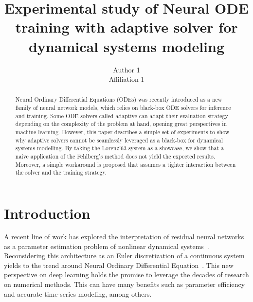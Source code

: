 \documentclass{article}
\title{Experimental study of Neural ODE training with adaptive solver
  for dynamical systems modeling}
\author{%
  Author 1\\
  Affiliation 1
}
\begin{document}
\maketitle

\begin{abstract}
  Neural Ordinary Differential Equations (ODEs) was recently
  introduced as a new family of neural network models, which relies on
  black-box ODE solvers for inference and training. Some ODE solvers
  called adaptive can adapt their evaluation strategy depending on the
  complexity of the problem at hand, opening great perspectives in
  machine learning. However, this paper describes a simple set of
  experiments to show why adaptive solvers cannot be seamlessly
  leveraged as a black-box for dynamical systems modelling. By taking
  the Lorenz'63 system as a showcase, we show that a naive application
  of the Fehlberg's method does not yield the expected
  results. Moreover, a simple workaround is proposed that assumes a
  tighter interaction between the solver and the training strategy.
\end{abstract}

\section{Introduction}
\label{sec:intro}



A recent line of work has explored the interpretation of residual
neural networks~\cite{He16Deep} as a parameter estimation problem of
nonlinear dynamical
systems~\cite{Haber17Stable,WE17Proposal,Lu18Beyond}.  Reconsidering
this architecture as an Euler discretization of a continuous system
yields to the trend around Neural Ordinary Differential
Equation~\cite{Chen18NODE}.  This new perspective on deep learning
holds the promise to leverage the decades of research on numerical
methods. This can have many benefits such as parameter efficiency and
accurate time-series modeling, among others.
\end{document}
